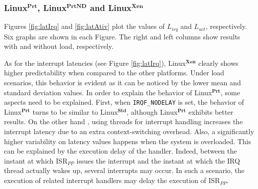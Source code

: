 \documentclass{acm_proc_article-sp}
\newcommand{\cod}[1]{\hspace{0.1cm}\texttt{#1}}
\begin{document}
\subsubsection*{Linux$^\mathbf{Prt}$, Linux$^\mathbf{PrtND}$ and
  Linux$^\mathbf{Xen}$}

Figures \ref{fig:latIrq} and \ref{fig:latAtiv} plot the values of $L_{irq}$ and
$L_{act}$, respectively.  Six graphs are shown in each Figure. The right and left
columns show results with and without load, respectively.

As for the interrupt latencies (see Figure \ref{fig:latIrq}), Linux$^{\mathbf{Xen}}$
clearly shows higher predictability when compared to the other platforms. Under load
scenarios, this behavior is evident as it can be noticed by the lower mean and
standard deviation values. In order to explain the behavior of
Linux$^{\mathbf{Prt}}$, some aspects need to be explained.  First, when
\cod{IRQF\_NODELAY} is set, the behavior of Linux$^{\mathbf{Prt}}$ turns to be
similar to Linux$^{\mathbf{Std}}$, although Linux$^{\mathbf{Prt}}$ exhibits better
results. On the other hand , using threads for interrupt handling increases the
interrupt latency due to an extra context-switching overhead.  Also, a significantly
higher variability on latency values happens when the system is overloaded. This can
be explained by the execution delay of the handler.  Indeed, between the instant at
which ISR$_{PP}$ issues the interrupt and the instant at which the IRQ thread actually
wakes up, several interrupts may occur.  In such a scenario, the execution of
related interrupt handlers may delay the execution of ISR$_{PP}$.
\end{document}
